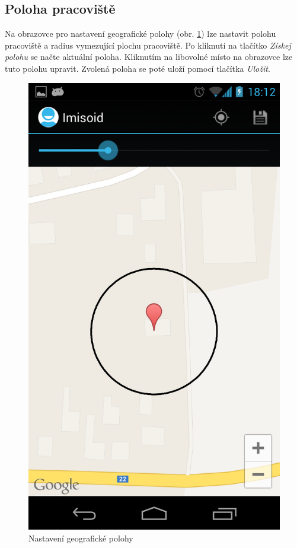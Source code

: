 \documentclass{diplomka}
\begin{document}
\newpage
\subsection{Poloha pracoviště}
\label{sec:location}
Na  obrazovce pro nastavení geografické polohy (obr. \ref{fig:location}) lze nastavit polohu pracoviště a radius vymezující plochu pracoviště. Po kliknutí na tlačítko \emph{Získej polohu} se načte aktuální poloha. Kliknutím na libovolné místo na obrazovce lze tuto polohu upravit. Zvolená poloha se poté uloží pomocí tlačítka  \emph{Uložit}.

\begin{figure}[H]
  \centering
  \includegraphics[scale=0.25]{scr/location.png}
  \caption{Nastavení geografické polohy}
  \label{fig:location}
\end{figure}
\end{document}
